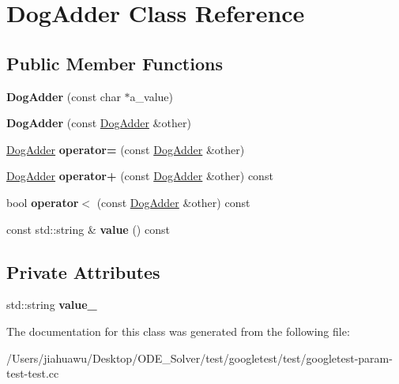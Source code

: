 \hypertarget{class_dog_adder}{}\section{Dog\+Adder Class Reference}
\label{class_dog_adder}
\subsection*{Public Member Functions}
\begin{DoxyCompactItemize}
\item 
\mbox{\label{class_dog_adder_a7fd76a2078834dc255c7dd7ac7c58f32}} 
{\bfseries Dog\+Adder} (const char $\ast$a\+\_\+value)
\item 
\mbox{\label{class_dog_adder_a35bb24b649b63f38784dcb44d55c4d94}} 
{\bfseries Dog\+Adder} (const \mbox{\hyperlink{class_dog_adder}{Dog\+Adder}} \&other)
\item 
\mbox{\label{class_dog_adder_a13bd773069c15b083f876b8afd512247}} 
\mbox{\hyperlink{class_dog_adder}{Dog\+Adder}} {\bfseries operator=} (const \mbox{\hyperlink{class_dog_adder}{Dog\+Adder}} \&other)
\item 
\mbox{\label{class_dog_adder_ad667166cdafb4352396e910faf09a55f}} 
\mbox{\hyperlink{class_dog_adder}{Dog\+Adder}} {\bfseries operator+} (const \mbox{\hyperlink{class_dog_adder}{Dog\+Adder}} \&other) const
\item 
\mbox{\label{class_dog_adder_a6d87d3ee06c0167e7552ba83daa629e7}} 
bool {\bfseries operator$<$} (const \mbox{\hyperlink{class_dog_adder}{Dog\+Adder}} \&other) const
\item 
\mbox{\label{class_dog_adder_a76bb9e42f79e9d4adacd9e48a3a3c9fb}} 
const std\+::string \& {\bfseries value} () const
\end{DoxyCompactItemize}
\subsection*{Private Attributes}
\begin{DoxyCompactItemize}
\item 
\mbox{\label{class_dog_adder_ac539b2207c940d290ed9b88211badce9}} 
std\+::string {\bfseries value\+\_\+}
\end{DoxyCompactItemize}


The documentation for this class was generated from the following file\+:\begin{DoxyCompactItemize}
\item 
/\+Users/jiahuawu/\+Desktop/\+O\+D\+E\+\_\+\+Solver/test/googletest/test/googletest-\/param-\/test-\/test.\+cc\end{DoxyCompactItemize}
